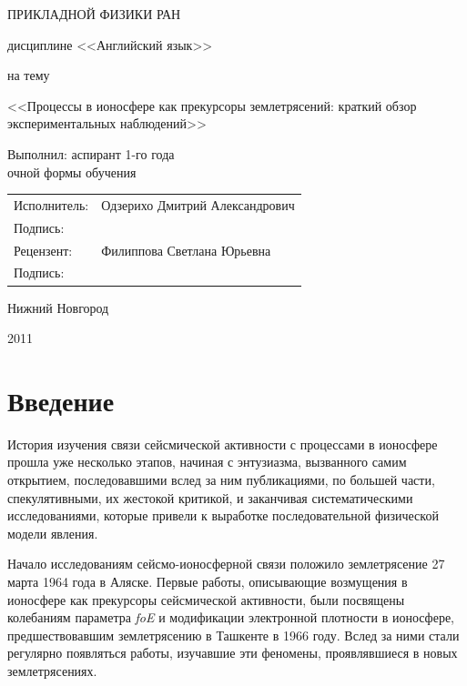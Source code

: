 \documentclass[12pt, oneside, a4paper]{article}
\begin{document}
\begin{titlepage}
\centerline{\large{} ПРИКЛАДНОЙ ФИЗИКИ РАН}
\vspace{3.0cm}
\centerline{\large{}}
\vspace{0.2cm}
\centerline{ дисциплине <<Английский язык>>}
\vspace{0.3cm}
\centerline{на тему}
\vspace{0.2cm}
\begin{center}
\large
<<Процессы в ионосфере как прекурсоры землетрясений: краткий обзор экспериментальных наблюдений>>
\vspace{1.0cm}
\begin{flushright}
\normalsize
Выполнил: аспирант 1-го года\\очной формы обучения 
\end{flushright}
\normalsize
\begin{flushright}
\begin{tabular}{>{\flushright}p{3.0cm}>{\flushleft}p{7.0cm}}
Исполнитель: & Одзерихо Дмитрий Александрович\tabularnewline
Подпись: &\tabularnewline
Рецензент: & Филиппова Светлана Юрьевна \tabularnewline
Подпись: &\tabularnewline
\end{tabular}
\end{flushright}
\vfill
\vspace{0.7cm}
\centerline{Нижний Новгород}
\centerline{2011}
\end{center}
\end{titlepage}
\tableofcontents
\newpage
\section{Введение}
История изучения связи сейсмической активности с процессами в ионосфере прошла уже несколько этапов, начиная с энтузиазма, вызванного самим открытием, последовавшими вслед за ним публикациями, по большей части, спекулятивными, их жестокой критикой, и заканчивая систематическими исследованиями, которые привели к выработке  последовательной физической модели явления. 

Начало исследованиям сейсмо-ионосферной связи положило землетрясение 27 марта 1964 года в Аляске. Первые работы, описывающие возмущения в ионосфере как прекурсоры сейсмической активности, были посвящены колебаниям параметра \emph{foE} и модификации электронной плотности в ионосфере, предшествовавшим землетрясению в Ташкенте в 1966 году. Вслед за ними стали регулярно появляться работы, изучавшие эти феномены, проявлявшиеся в новых землетрясениях. 
\end{document}
